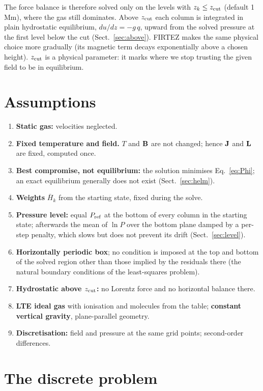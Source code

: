 The force balance is therefore solved only on the levels with $z_k\le z_{\rm cut}$ (default 1\,Mm), where the gas still
dominates. Above $z_{\rm cut}$ each column is integrated in plain hydrostatic equilibrium, $du/dz=-g\,q$, upward from the
solved pressure at the first level below the cut (Sect.~\ref{sec:above}). FIRTEZ makes the same physical choice more
gradually (its magnetic term decays exponentially above a chosen height). $z_{\rm cut}$ is a physical parameter: it marks
where we stop trusting the given field to be in equilibrium.

\section{Assumptions}\label{sec:assume}
\begin{enumerate}[label=\textbf{A\arabic*.},leftmargin=2.2em]
\item \textbf{Static gas:} velocities neglected.
\item \textbf{Fixed temperature and field.} $T$ and $\mathbf B$ are not changed; hence $\mathbf J$ and $\mathbf L$ are fixed, computed once.
\item \textbf{Best compromise, not equilibrium:} the solution minimises Eq.~\eqref{eq:Phi}; an exact equilibrium generally does
not exist (Sect.~\ref{sec:helm}).
\item \textbf{Weights} $\bar H_k$ from the starting state, fixed during the solve.
\item \textbf{Pressure level:} equal $P_{\rm ref}$ at the bottom of every column in the starting state; afterwards the mean
of $\ln P$ over the bottom plane damped by a per-step penalty, which slows but does not prevent its drift
(Sect.~\ref{sec:level}).
\item \textbf{Horizontally periodic box}; no condition is imposed at the top and bottom of the solved region other than those
implied by the residuals there (the natural boundary conditions of the least-squares problem).
\item \textbf{Hydrostatic above $z_{\rm cut}$:} no Lorentz force and no horizontal balance there.
\item \textbf{LTE ideal gas} with ionisation and molecules from the table; \textbf{constant vertical gravity}, plane-parallel
geometry.
\item \textbf{Discretisation:} field and pressure at the same grid points; second-order differences.
\end{enumerate}

\section{The discrete problem}\label{sec:disc}
